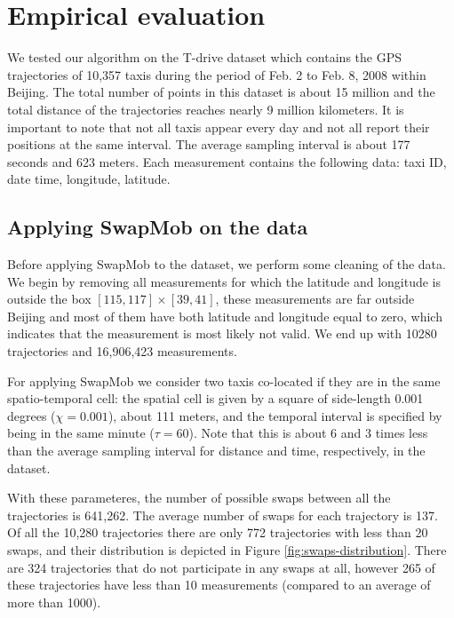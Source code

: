 \documentclass[times,twocolumn,final,authoryear]{elsarticle}
\begin{document}
\section{Empirical evaluation}\label{Sec:evaluation}
We tested our algorithm on the T-drive dataset
\citep{Yuan2010,Yuan2011} which contains the GPS trajectories of
10,357 taxis during the period of Feb. 2 to Feb. 8, 2008 within
Beijing. The total number of points in this dataset is about 15
million and the total distance of the trajectories reaches nearly 9
million kilometers. It is important to note that not all taxis appear
every day and not all report their positions at the same interval. The
average sampling interval is about 177 seconds and 623 meters. Each
measurement contains the following data: taxi ID, date time,
longitude, latitude.

\subsection{Applying SwapMob on the data}
Before applying SwapMob to the dataset, we perform some cleaning of the
data. We begin by removing all measurements for which the latitude and
longitude is outside the box $[115, 117] \times [39, 41]$, these
measurements are far outside Beijing and most of them have both
latitude and longitude equal to zero, which indicates that the
measurement is most likely not valid. We end up with 10280 trajectories and 16,906,423
measurements.

For applying SwapMob we consider two taxis co-located if they are in
the same spatio-temporal cell: the spatial cell is given by a square of side-length 0.001 degrees ($\chi = 0.001$), about 111
meters, and the temporal interval is specified by being in the same minute ($\tau = 60$). 
Note that this is about 6 and 3 times less than the average sampling interval for distance and time, respectively, in the dataset.

With these parameteres, the number of possible swaps between all the
trajectories is 641,262. The average number of swaps for each
trajectory is 137. Of all the 10,280 trajectories there are only 772 trajectories with less than 20 swaps, and their distribution is depicted in Figure
\ref{fig:swaps-distribution}. There are 324 trajectories that do not
participate in any swaps at all, however 265 of these trajectories
have less than 10 measurements (compared to an average of more than
1000). 
\end{document}

